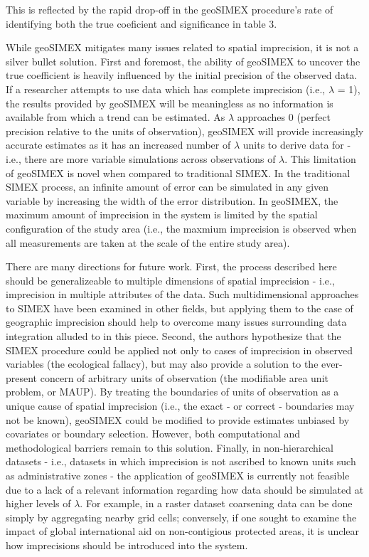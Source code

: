This is reflected by the rapid drop-off in the geoSIMEX procedure's rate of identifying both the true coeficient and significance in table 3.
\par
While geoSIMEX mitigates many issues related to spatial imprecision, it is not a silver bullet solution.
First and foremost, the ability of geoSIMEX to uncover the true coefficient is heavily influenced by the initial precision of the observed data.
If a researcher attempts to use data which has complete imprecision (i.e., $\lambda$ = 1), the results provided by geoSIMEX will be meaningless as no information is available from which a trend can be estimated.
As $\lambda$ approaches 0 (perfect precision relative to the units of observation), geoSIMEX will provide increasingly accurate estimates as it has an increased number of $\lambda$ units to derive data for - i.e., there are more variable simulations across observations of $\lambda$.
This limitation of geoSIMEX is novel when compared to traditional SIMEX.
In the traditional SIMEX process, an infinite amount of error can be simulated in any given variable by increasing the width of the error distribution.
In geoSIMEX, the maximum amount of imprecision in the system is limited by the spatial configuration of the study area (i.e., the maxmium imprecision is observed when all measurements are taken at the scale of the entire study area).
\par
There are many directions for future work.
First, the process described here should be generalizeable to multiple dimensions of spatial imprecision - i.e., imprecision in multiple attributes of the data.
Such multidimensional approaches to SIMEX have been examined in other fields, but applying them to the case of geographic imprecision should help to overcome many issues surrounding data integration alluded to in this piece.
Second, the authors hypothesize that the SIMEX procedure could be applied not only to cases of imprecision in observed variables (the ecological fallacy), but may also provide a solution to the ever-present concern of arbitrary units of observation (the modifiable area unit problem, or MAUP).
By treating the boundaries of units of observation as a unique cause of spatial imprecision (i.e., the exact - or correct - boundaries may not be known), geoSIMEX could be modified to provide estimates unbiased by covariates or boundary selection.
However, both computational and methodological barriers remain to this solution.
Finally, in non-hierarchical datasets - i.e., datasets in which imprecision is not ascribed to known units such as administrative zones - the application of geoSIMEX is currently not feasible due to a lack of a relevant information regarding how data should be simulated at higher levels of $\lambda$.
For example, in a raster dataset coarsening data can be done simply by aggregating nearby grid cells; conversely, if one sought to examine the impact of global international aid on non-contigious protected areas, it is unclear how imprecisions should be introduced into the system.  




